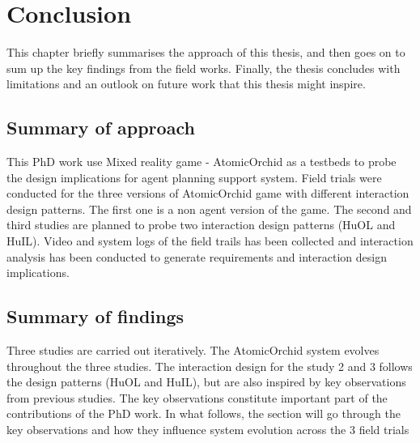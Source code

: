 \chapter{Conclusion}

This chapter briefly summarises the approach of this thesis, and then goes on to sum up the key findings from the field works. Finally, the thesis concludes with limitations and an outlook on future work that this thesis might inspire.\\

\section{Summary of approach}
This PhD work use Mixed reality game - AtomicOrchid as a testbeds to probe the design implications for agent planning support system. Field trials were conducted for the three versions of AtomicOrchid game with different interaction design patterns. The first one is a non agent version of the game. The second and third studies are planned to probe two interaction design patterns (HuOL and HuIL). Video and system logs of the field trails has been collected and interaction analysis has been conducted to generate requirements and interaction design implications. \\


\section{Summary of findings}
Three studies are carried out iteratively. The AtomicOrchid system evolves throughout the three studies. The interaction design for the study 2 and 3 follows the design patterns (HuOL and HuIL), but are also inspired by key observations from previous studies. The key observations constitute important part of the contributions of the PhD work. In what follows, the section will go through the key observations and how they influence system evolution across the 3 field trials \\ 

